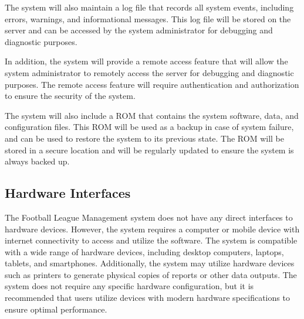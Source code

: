 \documentclass[12pt]{article}
\begin{document}
The system will also maintain a log file that records all system events, including errors, warnings, and informational messages. This log file will be stored on the server and can be accessed by the system administrator for debugging and diagnostic purposes.

In addition, the system will provide a remote access feature that will allow the system administrator to remotely access the server for debugging and diagnostic purposes. The remote access feature will require authentication and authorization to ensure the security of the system.

The system will also include a ROM that contains the system software, data, and configuration files. This ROM will be used as a backup in case of system failure, and can be used to restore the system to its previous state. The ROM will be stored in a secure location and will be regularly updated to ensure the system is always backed up.

\subsection{Hardware Interfaces}
The Football League Management system does not have any direct interfaces to hardware devices. However, the system requires a computer or mobile device with internet connectivity to access and utilize the software. The system is compatible with a wide range of hardware devices, including desktop computers, laptops, tablets, and smartphones. Additionally, the system may utilize hardware devices such as printers to generate physical copies of reports or other data outputs. The system does not require any specific hardware configuration, but it is recommended that users utilize devices with modern hardware specifications to ensure optimal performance.
\end{document}
